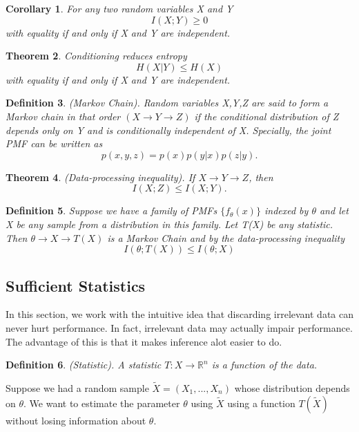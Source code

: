 \documentclass[twoside]{article}
\newcounter{lecnum}
\newtheorem{theorem}{Theorem}[lecnum]
\newtheorem{corollary}[theorem]{Corollary}
\newtheorem{definition}[theorem]{Definition}
\begin{document}
\begin{corollary}For any two random variables X and Y 
$$
I(X;Y) \geq 0
$$
with equality if and only if X and Y are independent.
\end{corollary}

\begin{theorem}Conditioning reduces entropy 
$$
H(X|Y) \leq H(X)
$$
with equality if and only if X and Y are independent.
\end{theorem}

\begin{definition}(Markov Chain). Random variables X,Y,Z are said to form a Markov chain in that order $(X \rightarrow Y \rightarrow Z)$ if the conditional distribution of Z depends only on Y and is conditionally independent of X. Specially, the joint PMF can be written as 
$$
p(x,y,z) = p(x)p(y|x)p(z|y).
$$
\end{definition}

\begin{theorem}(Data-processing inequality). If $X \rightarrow Y \rightarrow Z$, then 
$$
I(X;Z) \leq I(X;Y).
$$
\end{theorem}

\begin{definition}Suppose we have a family of PMFs $\{f_{\theta}(x)\}$ indexed by $\theta$ and let X be any sample from a distribution in this family. Let T(X) be any statistic. Then $\theta \rightarrow X \rightarrow T(X)$ is a Markov Chain and by the data-processing inequality
$$
I(\theta;T(X)) \leq I(\theta; X)
$$
\end{definition}

\subsection{Sufficient Statistics}
In this section, we work with the intuitive idea that discarding irrelevant data can never hurt performance. In fact, irrelevant data may actually impair performance. The advantage of this is that it makes inference alot easier to do.\\

\begin{definition}(Statistic). A statistic $T: X \rightarrow 
\mathbb{R}^n$ is a function of the data.
\end{definition}

Suppose we had a random sample $\tilde{X} = (X_1,...,X_n)$ whose distribution depends on $\theta$. We want to estimate the parameter $\theta$ using $\tilde{X}$ using a function $T(\tilde{X})$ without losing information about $\theta$.
\end{document}
